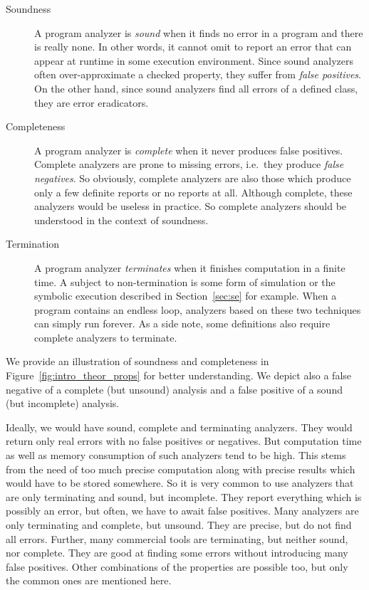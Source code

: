 \begin{description}
\item[Soundness]
A program analyzer is \emph{sound} when it finds no error in a program and
there is really none. In other words, it cannot omit to report an error that
can appear at runtime in some execution environment. Since sound analyzers
often over-approximate a checked property, they suffer from \emph{false
positives}. On the other hand, since sound analyzers find all errors of a
defined class, they are error eradicators.

\item[Completeness]
A program analyzer is \emph{complete} when it never produces false positives.
Complete analyzers are prone to missing errors, i.e.\ they produce \emph{false
negatives}. So obviously, complete analyzers are also those which produce only
a few definite reports or no reports at all. Although complete, these
analyzers would be useless in practice. So complete analyzers should be
understood in the context of soundness.

\item[Termination]
A program analyzer \emph{terminates} when it finishes computation in a finite
time. A subject to non-termination is some form of simulation or the symbolic
execution described in Section~\ref{sec:se} for example. When a program
contains an endless loop, analyzers based on these two techniques can simply
run forever. As a side note, some definitions also require complete analyzers
to terminate.

\end{description}

We provide an illustration of soundness and completeness in
Figure~\ref{fig:intro_theor_props} for better understanding. We depict also a
false negative of a complete (but unsound) analysis and a false positive of a
sound (but incomplete) analysis.

Ideally, we would have sound, complete and terminating analyzers. They would
return only real errors with no false positives or negatives. But computation
time as well as memory consumption of such analyzers tend to be high. This
stems from the need of too much precise computation along with precise results
which would have to be stored somewhere. So it is very common to use analyzers
that are only terminating and sound, but incomplete. They report everything
which is possibly an error, but often, we have to await false positives.
Many analyzers are only terminating and complete, but unsound. They are
precise, but do not find all errors. Further, many commercial tools are
terminating, but neither sound, nor complete. They are good at finding some
errors without introducing many false positives. Other combinations of the
properties are possible too, but only the common ones are mentioned here.

